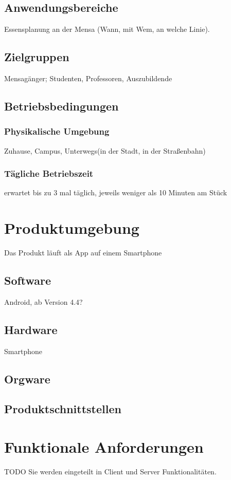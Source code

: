 \documentclass[a4paper]{scrreprt}
\begin{document}
 
\section{Anwendungsbereiche}
Essensplanung an der Mensa (Wann, mit Wem, an welche Linie).
 
\section{Zielgruppen}
Mensagänger; Studenten, Professoren, Auszubildende 
 
\section{Betriebsbedingungen}
\subsection{Physikalische Umgebung}
Zuhause, Campus, Unterwegs(in der Stadt, in der Straßenbahn)

\subsection{Tägliche Betriebszeit}
erwartet bis zu 3 mal täglich, jeweils weniger als 10 Minuten am Stück 
 
\chapter{Produktumgebung}
Das Produkt läuft als App auf einem Smartphone

\section{Software}
Android, ab Version 4.4?
 
\section{Hardware}
Smartphone 
 
\section{Orgware}

\section{Produktschnittstellen} 
 
\chapter{Funktionale Anforderungen}
TODO Sie werden eingeteilt in Client und Server Funktionalitäten.
\end{document}

